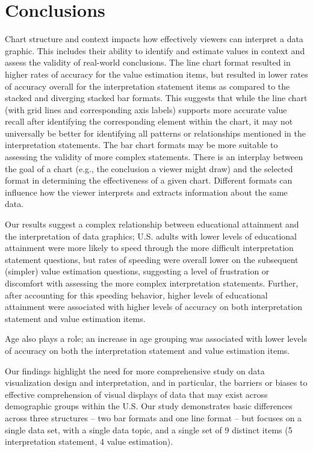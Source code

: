 \documentclass{IEEEcsmag}
\begin{document}
\section{Conclusions}\label{conclusions}

Chart structure and context impacts how effectively viewers can interpret a data graphic. This includes their ability to identify and estimate values in context and assess the validity of real-world conclusions. The line chart format resulted in higher rates of accuracy for the value estimation items, but resulted in lower rates of accuracy overall for the interpretation statement items as compared to the stacked and diverging stacked bar formats. This suggests that while the line chart (with grid lines and corresponding axis labels) supports more accurate value recall after identifying the corresponding element within the chart, it may not universally be better for identifying all patterns or relationships mentioned in the interpretation statements. The bar chart formats may be more suitable to assessing the validity of more complex statements. There is an interplay between the goal of a chart (e.g., the conclusion a viewer might draw) and the selected format in determining the effectiveness of a given chart. Different formats can influence how the viewer interprets and extracts information about the same data.

Our results suggest a complex relationship between educational attainment and the interpretation of data graphics; U.S. adults with lower levels of educational attainment were more likely to speed through the more difficult interpretation statement questions, but rates of speeding were overall lower on the subsequent (simpler) value estimation questions, suggesting a level of frustration or discomfort with assessing the more complex interpretation statements. Further, after accounting for this speeding behavior, higher levels of educational attainment were associated with higher levels of accuracy on both interpretation statement and value estimation items.

Age also plays a role; an increase in age grouping was associated with lower levels of accuracy on both the interpretation statement and value estimation items.

Our findings highlight the need for more comprehensive study on data visualization design and interpretation, and in particular, the barriers or biases to effective comprehension of visual displays of data that may exist across demographic groups within the U.S. Our study demonstrates basic differences across three structures -- two bar formats and one line format -- but focuses on a single data set, with a single data topic, and a single set of 9 distinct items (5 interpretation statement, 4 value estimation).
\end{document}
